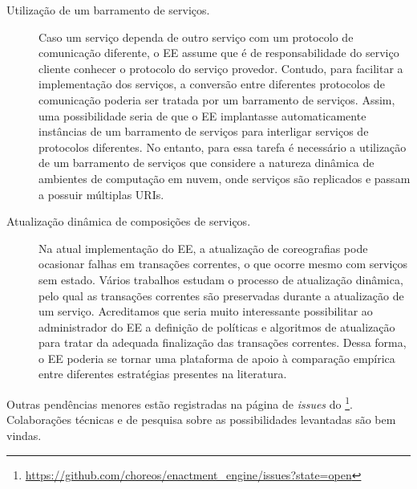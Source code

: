 \begin{description}
\item[Utilização de um barramento de serviços.] Caso um serviço dependa
de outro serviço com um protocolo de comunicação diferente, o EE assume que é de
responsabilidade do serviço cliente conhecer o protocolo do serviço provedor.
Contudo, para facilitar a implementação dos serviços, a conversão entre
diferentes protocolos de comunicação poderia ser tratada por um barramento de serviços.
Assim, uma possibilidade seria de que o EE implantasse automaticamente instâncias
de um barramento de serviços para interligar serviços de protocolos diferentes.
No entanto, para essa tarefa é necessário a utilização de um barramento de serviços
que considere a natureza dinâmica de ambientes de computação em nuvem,
onde serviços são replicados e passam a possuir múltiplas URIs.

\item[Atualização dinâmica de composições de serviços.] Na atual implementação do EE,
a atualização de coreografias pode ocasionar falhas em transações correntes,
o que ocorre mesmo com serviços sem estado.
Vários trabalhos \cite{Kramer1990Philosophers, Vandewoude2007Tranquility, Xiaoxing2011VersionConsistent} 
estudam o processo de atualização dinâmica, pelo qual as transações correntes 
são preservadas durante a atualização de um serviço. 
Acreditamos que seria muito interessante possibilitar ao administrador do EE
a definição de políticas e algoritmos de atualização para 
tratar da adequada finalização das transações correntes.
Dessa forma, o EE poderia se tornar uma plataforma de apoio
à comparação empírica entre diferentes estratégias presentes na literatura.

\end{description}

Outras pendências menores estão registradas na página de \emph{issues} 
do \ee\footnote{\url{https://github.com/choreos/enactment_engine/issues?state=open}}.
Colaborações técnicas e de pesquisa sobre as possibilidades levantadas
são bem vindas.






